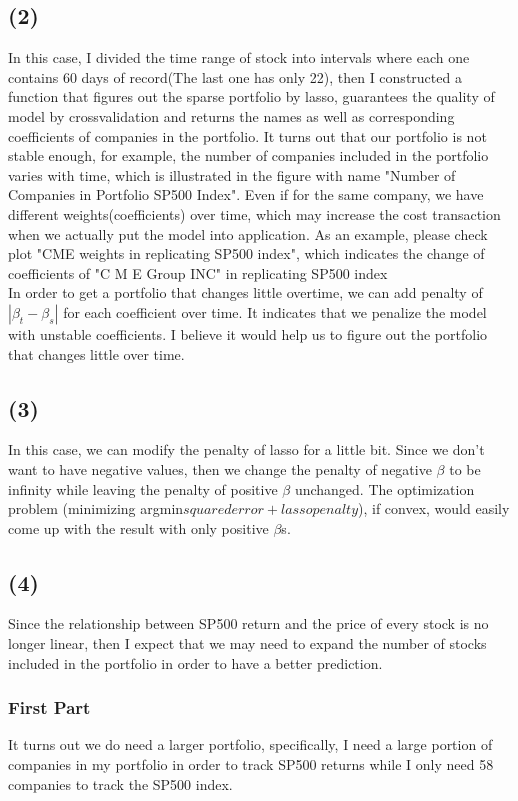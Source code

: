 \documentclass{article}\usepackage[]{graphicx}\usepackage[]{color}
\begin{document}
\subsection*{(2)}
In this case, I divided the time range of stock into intervals where each one contains 60 days of record(The last one has only 22), then I constructed a function that figures out the sparse portfolio by lasso, guarantees the quality of model by crossvalidation and returns the names as well as corresponding coefficients of companies in the portfolio. It turns out that our portfolio is not stable enough, for example, the number of companies included in the portfolio varies with time, which is illustrated in the figure with name "Number of Companies in Portfolio SP500 Index". Even if for the same company, we have different weights(coefficients) over time, which may increase the cost transaction when we actually put the model into application. As an example, please check plot "CME weights in replicating SP500 index", which indicates the change of coefficients of "C M E Group INC" in replicating SP500 index\\
In order to get a portfolio that changes little overtime, we can add penalty of $|\beta_t - \beta_s|$ for each coefficient over time. It indicates that we penalize the model with unstable coefficients. I believe it would help us to figure out the portfolio that changes little over time.

\subsection*{(3)}
In this case, we can modify the penalty of lasso for a little bit. Since we don't want to have negative values, then we change the penalty of negative $\beta$ to be infinity while leaving the penalty of positive $\beta$ unchanged. The optimization problem (minimizing argmin${squared error + lasso penalty}$), if convex, would easily come up with the result with only positive $\beta$s. 

\subsection*{(4)}
Since the relationship between SP500 return and the price of every stock is no longer linear, then I expect that we may need to expand the number of stocks included in the portfolio in order to have a better prediction. \\
\subsubsection*{First Part}
It turns out we do need a larger portfolio, specifically, I need a large portion of companies in my portfolio in order to track SP500 returns while I only need 58 companies to track the SP500 index.\\
\end{document}

